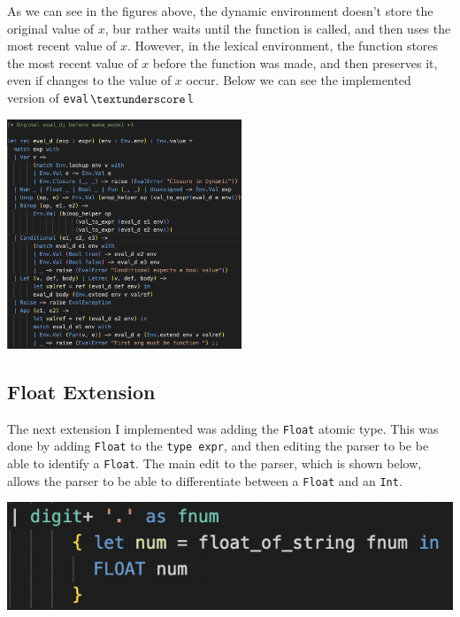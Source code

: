\documentclass[12pt]{article}
\def\code#1{\texttt{#1}}
\begin{document}
As we can see in the figures above, the dynamic environment doesn't store the original value of $x$, bur rather waits until the function is called, and then uses the most recent value of $x$.  However, in the lexical environment, the function stores the most recent value of $x$ before the function was made, and then preserves it, even if changes to the value of $x$ occur. Below we can see the implemented version of \code{eval$\textunderscore$l}
\begin{center}
    \includegraphics[width=7cm]{Eval_D.png}
\end{center}

\subsection{Float Extension}
The next extension I implemented was adding the \code{Float} atomic type. This was done by adding \code{Float} to the \code{type expr}, and then editing the parser to be be able to identify a \code{Float}. The main edit to the parser, which is shown below, allows the parser to be able to differentiate between a \code{Float} and an \code{Int}.
\begin{center}
    \includegraphics{Float.png}
\end{center}
\end{document}
